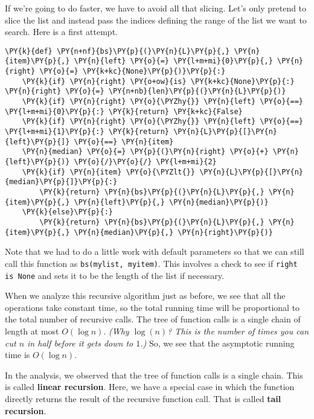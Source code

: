 If we're going to do faster, we have to avoid all that slicing.
Let's only pretend to slice the list and instead pass the indices defining the range of the list we want to search.
Here is a first attempt.

\begin{Verbatim}[commandchars=\\\{\}]
\PY{k}{def} \PY{n+nf}{bs}\PY{p}{(}\PY{n}{L}\PY{p}{,} \PY{n}{item}\PY{p}{,} \PY{n}{left} \PY{o}{=} \PY{l+m+mi}{0}\PY{p}{,} \PY{n}{right} \PY{o}{=} \PY{k+kc}{None}\PY{p}{)}\PY{p}{:}
    \PY{k}{if} \PY{n}{right} \PY{o+ow}{is} \PY{k+kc}{None}\PY{p}{:} \PY{n}{right} \PY{o}{=} \PY{n+nb}{len}\PY{p}{(}\PY{n}{L}\PY{p}{)}
    \PY{k}{if} \PY{n}{right} \PY{o}{\PYZhy{}} \PY{n}{left} \PY{o}{==} \PY{l+m+mi}{0}\PY{p}{:} \PY{k}{return} \PY{k+kc}{False}
    \PY{k}{if} \PY{n}{right} \PY{o}{\PYZhy{}} \PY{n}{left} \PY{o}{==} \PY{l+m+mi}{1}\PY{p}{:} \PY{k}{return} \PY{n}{L}\PY{p}{[}\PY{n}{left}\PY{p}{]} \PY{o}{==} \PY{n}{item}
    \PY{n}{median} \PY{o}{=} \PY{p}{(}\PY{n}{right} \PY{o}{+} \PY{n}{left}\PY{p}{)} \PY{o}{/}\PY{o}{/} \PY{l+m+mi}{2}
    \PY{k}{if} \PY{n}{item} \PY{o}{\PYZlt{}} \PY{n}{L}\PY{p}{[}\PY{n}{median}\PY{p}{]}\PY{p}{:}
        \PY{k}{return} \PY{n}{bs}\PY{p}{(}\PY{n}{L}\PY{p}{,} \PY{n}{item}\PY{p}{,} \PY{n}{left}\PY{p}{,} \PY{n}{median}\PY{p}{)}
    \PY{k}{else}\PY{p}{:}
        \PY{k}{return} \PY{n}{bs}\PY{p}{(}\PY{n}{L}\PY{p}{,} \PY{n}{item}\PY{p}{,} \PY{n}{median}\PY{p}{,} \PY{n}{right}\PY{p}{)}
\end{Verbatim}



Note that we had to do a little work with default parameters so that we can still call this function as \texttt{bs(mylist, myitem)}.
This involves a check to see if \texttt{right is None} and sets it to be the length of the list if necessary.


When we analyze this recursive algorithm just as before, we see that all the operations take constant time, so the total running time will be proportional to the total number of recursive calls.
The tree of function calls is a single chain of length at most $O(\log n)$.
\emph{(Why $\log(n)$?  This is the number of times you can cut $n$ in half before it gets down to $1$.)}
So, we see that the asymptotic running time is $O(\log n)$.


In the analysis, we observed that the tree of function calls is a single chain.
This is called \textbf{linear recursion}.
Here, we have a special case in which the function directly returns the result of the recursive function call.
That is called \textbf{tail recursion}.


